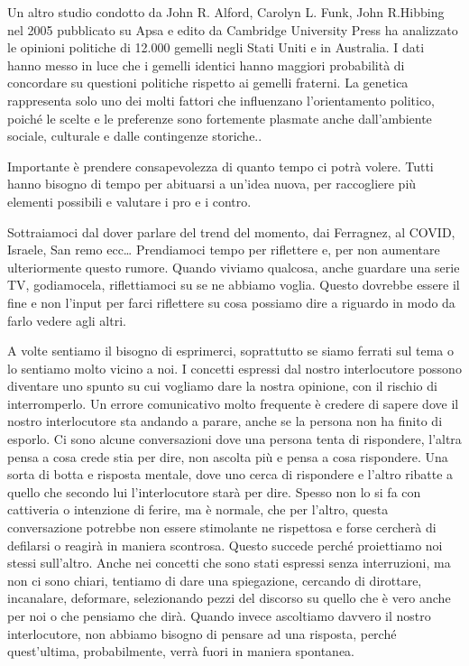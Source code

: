 \documentclass[12pt]{book} %
\begin{document}
Un altro studio condotto da John R. Alford, Carolyn L. Funk, John R.Hibbing nel 2005 pubblicato su Apsa e edito da
Cambridge University
Press ha analizzato le opinioni politiche di 12.000 gemelli negli Stati Uniti e in Australia. I dati hanno messo in luce
che i gemelli identici hanno maggiori probabilità di concordare su questioni politiche rispetto ai gemelli fraterni.
La genetica rappresenta solo uno dei molti fattori che influenzano l'orientamento politico, poiché le scelte e le preferenze sono fortemente plasmate anche dall'ambiente sociale, culturale e dalle contingenze storiche..

Importante è prendere consapevolezza di quanto tempo ci potrà volere. Tutti hanno bisogno di tempo per abituarsi a
un'idea nuova, per raccogliere più elementi possibili e valutare i pro e i
contro.

Sottraiamoci dal dover parlare del trend del momento, dai Ferragnez, al COVID, Israele, San remo ecc… Prendiamoci tempo per riflettere e, per non aumentare ulteriormente questo rumore. Quando viviamo qualcosa, anche guardare una serie TV, godiamocela, riflettiamoci su se ne abbiamo voglia. Questo dovrebbe essere il fine e non l'input per farci riflettere su cosa possiamo dire a riguardo in modo da farlo vedere agli altri.

A volte sentiamo il bisogno di esprimerci, soprattutto se siamo ferrati sul tema o lo sentiamo molto vicino a noi. I concetti espressi dal nostro interlocutore possono diventare uno spunto su cui vogliamo dare la nostra opinione, con il rischio di interromperlo. Un errore comunicativo molto frequente è credere di sapere dove il nostro interlocutore sta andando a
parare, anche se la persona non ha finito di esporlo. Ci sono alcune conversazioni dove una persona tenta di
rispondere, l'altra pensa a cosa crede stia per dire, non ascolta più e pensa a cosa rispondere.
Una sorta di botta e risposta mentale, dove uno cerca di rispondere e l'altro ribatte a quello che
secondo lui l'interlocutore starà per dire. Spesso non lo si fa con cattiveria o intenzione di
ferire, ma è normale, che per l'altro, questa conversazione potrebbe non essere stimolante ne rispettosa e forse
cercherà di defilarsi o reagirà in maniera scontrosa. Questo succede perché proiettiamo noi stessi
sull'altro. Anche nei concetti che sono stati espressi senza interruzioni, ma non ci sono chiari,
tentiamo di dare una spiegazione, cercando di dirottare, incanalare, deformare, selezionando pezzi del discorso su
quello che è vero anche per noi o che pensiamo che dirà. Quando invece ascoltiamo davvero il nostro interlocutore, non
abbiamo bisogno di pensare ad una risposta, perché quest'ultima, probabilmente, verrà fuori in maniera spontanea.
\end{document}
